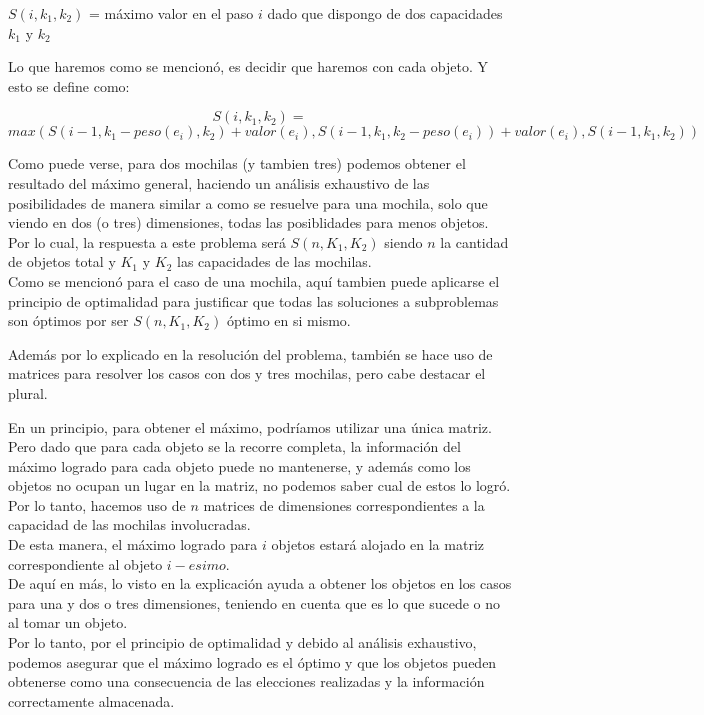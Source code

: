 \begin{center}
$S(i, k_1, k_2)$ = máximo valor en el paso $i$ dado que dispongo de dos capacidades $k_1$ y $k_2$
\end{center}

Lo que haremos como se mencionó, es decidir que haremos con cada objeto. Y esto se define como:

\begin{equation}
S(i, k_1, k_2) = 
\end{equation}
\begin{equation}
max(S(i-1, k_1-peso(e_i), k_2)+valor(e_i), 
        S(i-1, k_1, k_2-peso(e_i))+valor(e_i), 
        S(i-1, k_1, k_2))
\end{equation}

Como puede verse, para dos mochilas (y tambien tres) podemos obtener el resultado del máximo general, haciendo un análisis exhaustivo de las posibilidades de manera similar a como se resuelve para una mochila, solo que viendo en dos (o tres) dimensiones, todas las posiblidades para menos objetos.\\
Por lo cual, la respuesta a este problema será $S(n, K_1, K_2)$ siendo $n$ la cantidad de objetos total y $K_1$ y $K_2$ las capacidades de las mochilas.\\

Como se mencionó para el caso de una mochila, aquí tambien puede aplicarse el principio de optimalidad para justificar que todas las soluciones a subproblemas son óptimos por ser $S(n, K_1, K_2)$ óptimo en si mismo.

Además por lo explicado en la resolución del problema, tambi\'en se hace uso de matrices para resolver los casos con dos y tres mochilas, pero cabe destacar el plural. 

En un principio, para obtener el máximo, podr\'iamos utilizar una única matriz. Pero dado que para cada objeto se la recorre completa, la información del máximo logrado para cada objeto puede no mantenerse, y además como los objetos no ocupan un lugar en la matriz, no podemos saber cual de estos lo logró.\\
Por lo tanto, hacemos uso de $n$ matrices de dimensiones correspondientes a la capacidad de las mochilas involucradas. \\

De esta manera, el máximo logrado para $i$ objetos estará alojado en la matriz correspondiente al objeto $i-esimo$.\\

De aquí en más, lo visto en la explicación ayuda a obtener los objetos en los casos para una y dos o tres dimensiones, teniendo en cuenta que es lo que sucede o no al tomar un objeto. \\

Por lo tanto, por el principio de optimalidad y debido al análisis exhaustivo, podemos asegurar que el máximo logrado es el \'optimo y que los objetos pueden obtenerse como una consecuencia de las elecciones realizadas y la información correctamente almacenada.


